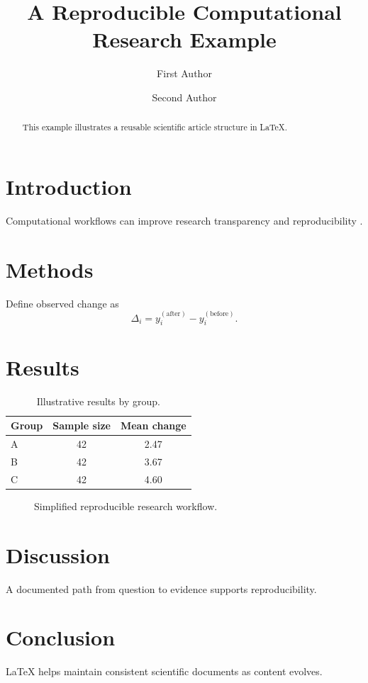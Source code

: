 \documentclass[11pt]{article}
\title{A Reproducible Computational Research Example}
\author{First Author \and Second Author}
\date{}
\begin{document}
\maketitle

\begin{abstract}
This example illustrates a reusable scientific article structure in LaTeX.
\end{abstract}

\section{Introduction}
Computational workflows can improve research transparency and reproducibility \cite{wilson2014best}.

\section{Methods}
Define observed change as
\begin{equation}
\Delta_i=y_i^{(\mathrm{after})}-y_i^{(\mathrm{before})}.
\end{equation}

\section{Results}

\begin{table}[ht]
\centering
\caption{Illustrative results by group.}
\begin{tabular}{lcc}\toprule
Group & Sample size & Mean change\\\midrule
A&42&2.47\\ B&42&3.67\\ C&42&4.60\\\bottomrule
\end{tabular}
\end{table}

\begin{figure}[ht]
\centering
{}
\caption{Simplified reproducible research workflow.}
\end{figure}

\section{Discussion}
A documented path from question to evidence supports reproducibility.

\section{Conclusion}
LaTeX helps maintain consistent scientific documents as content evolves.



\end{document}
